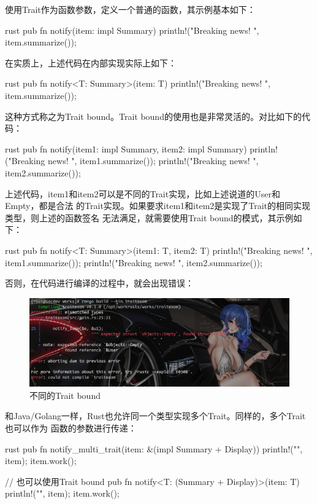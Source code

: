 使用Trait作为函数参数，定义一个普通的函数，其示例基本如下：
\begin{code-block}{rust}
pub fn notify(item: impl Summary) {
    println!("Breaking news! {}", item.summarize());
}
\end{code-block}

在实质上，上述代码在内部实现实际上如下：
\begin{code-block}{rust}
pub fn notify<T: Summary>(item: T) {
    println!("Breaking news! {}", item.summarize());
}
\end{code-block}
这种方式称之为Trait bound。Trait bound的使用也是非常灵活的。对比如下的代码：
\begin{code-block}{rust}
pub fn notify(item1: impl Summary, item2: impl Summary) {
    println!("Breaking news! {}", item1.summarize());
    println!("Breaking news! {}", item2.summarize());
}
\end{code-block}
上述代码，item1和item2可以是不同的Trait实现，比如上述说道的User和Empty，都是合法
的Trait实现。如果要求item1和item2是实现了Trait的相同实现类型，则上述的函数签名
无法满足，就需要使用Trait bound的模式，其示例如下：
\begin{code-block}{rust}
pub fn notify<T: Summary>(item1: T, item2: T) {
    println!("Breaking news! {}", item1.summarize());
    println!("Breaking news! {}", item2.summarize());
}
\end{code-block}
否则，在代码进行编译的过程中，就会出现错误：
\begin{figure}[H]
  \centering
  \includegraphics[scale=0.3]{rust_trait_bound.png}
  \caption{不同的Trait bound}
  \label{fig:rust_trait_bound}
\end{figure}

和Java/Golang一样，Rust也允许同一个类型实现多个Trait。同样的，多个Trait也可以作为
函数的参数进行传递：
\begin{code-block}{rust}
pub fn notify_multi_trait(item: &(impl Summary + Display)) {
    println!("{}", item);
    item.work();
}

// 也可以使用Trait bound
pub fn notify<T: (Summary + Display)>(item: T) {
    println!("{}", item);
    item.work();
}
\end{code-block}


